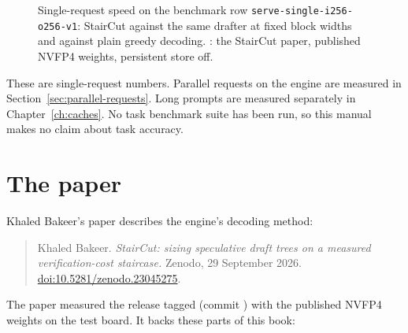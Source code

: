 \begin{figure}[htbp]
\centering
{}
\caption{Single-request speed on the benchmark row \texttt{serve-single-i256-o256-v1}: StairCut against the same drafter at fixed block widths and against plain greedy decoding. \measured: the StairCut paper, published NVFP4 weights, persistent store off.}\label{fig:headline}
\end{figure}

These are single-request numbers. Parallel requests on the engine are measured in Section~\ref{sec:parallel-requests}. Long prompts are measured separately in Chapter~\ref{ch:caches}. No task benchmark suite has been run, so this manual makes no claim about task accuracy.

\section{The paper}\label{sec:paper}

Khaled Bakeer's paper describes the engine's decoding method:

\begin{quote}
Khaled Bakeer. \emph{StairCut: sizing speculative draft trees on a measured verification-cost staircase.} Zenodo, 29 September 2026. \href{https://doi.org/10.5281/zenodo.23045275}{doi:10.5281/zenodo.23045275}.
\end{quote}

The paper measured the release tagged  (commit ) with the published NVFP4 weights on the test board. It backs these parts of this book:

